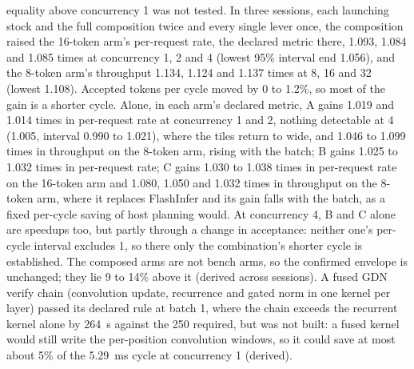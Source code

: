 equality above concurrency 1 was not tested. In three sessions, each launching stock and the full composition twice and every single lever once, the composition raised the 16-token arm's per-request rate, the declared metric there, 1.093, 1.084 and 1.085 times at concurrency 1, 2 and 4 (lowest 95\% interval end 1.056), and the 8-token arm's throughput 1.134, 1.124 and 1.137 times at 8, 16 and 32 (lowest 1.108). Accepted tokens per cycle moved by 0 to 1.2\%, so most of the gain is a shorter cycle. Alone, in each arm's declared metric, A gains 1.019 and 1.014 times in per-request rate at concurrency 1 and 2, nothing detectable at 4 (1.005, interval 0.990 to 1.021), where the tiles return to wide, and 1.046 to 1.099 times in throughput on the 8-token arm, rising with the batch; B gains 1.025 to 1.032 times in per-request rate; C gains 1.030 to 1.038 times in per-request rate on the 16-token arm and 1.080, 1.050 and 1.032 times in throughput on the 8-token arm, where it replaces FlashInfer and its gain falls with the batch, as a fixed per-cycle saving of host planning would. At concurrency 4, B and C alone are speedups too, but partly through a change in acceptance: neither one's per-cycle interval excludes 1, so there only the combination's shorter cycle is established. The composed arms are not bench arms, so the confirmed envelope is unchanged; they lie 9 to 14\% above it (derived across sessions). A fused GDN verify chain (convolution update, recurrence and gated norm in one kernel per layer) passed its declared rule at batch 1, where the chain exceeds the recurrent kernel alone by 264~\textmu s against the 250 required, but was not built: a fused kernel would still write the per-position convolution windows, so it could save at most about 5\% of the 5.29~ms cycle at concurrency 1 (derived).

